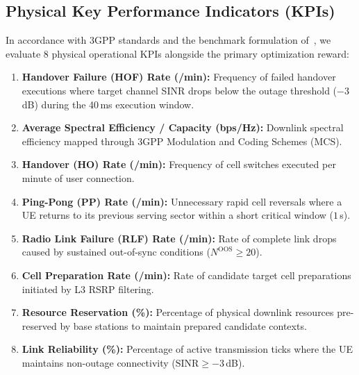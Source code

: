 \documentclass{ieeetmlcn}
\begin{document}
\subsection{Physical Key Performance Indicators (KPIs)}
In accordance with 3GPP standards and the benchmark formulation of~\cite{cmab_ho}, we evaluate 8 physical operational KPIs alongside the primary optimization reward:
\begin{enumerate}\setlength\itemsep{0.5pt}\setlength\parskip{0pt}
    \item \textbf{Handover Failure (HOF) Rate (/min):} Frequency of failed handover executions where target channel SINR drops below the outage threshold ($-3$\,dB) during the 40\,ms execution window.
    \item \textbf{Average Spectral Efficiency / Capacity (bps/Hz):} Downlink spectral efficiency mapped through 3GPP Modulation and Coding Schemes (MCS).
    \item \textbf{Handover (HO) Rate (/min):} Frequency of cell switches executed per minute of user connection.
    \item \textbf{Ping-Pong (PP) Rate (/min):} Unnecessary rapid cell reversals where a UE returns to its previous serving sector within a short critical window ($1$\,s).
    \item \textbf{Radio Link Failure (RLF) Rate (/min):} Rate of complete link drops caused by sustained out-of-sync conditions ($N^{\text{OOS}} \ge 20$).
    \item \textbf{Cell Preparation Rate (/min):} Rate of candidate target cell preparations initiated by L3 RSRP filtering.
    \item \textbf{Resource Reservation (\%):} Percentage of physical downlink resources pre-reserved by base stations to maintain prepared candidate contexts.
    \item \textbf{Link Reliability (\%):} Percentage of active transmission ticks where the UE maintains non-outage connectivity ($\text{SINR} \ge -3$\,dB).
\end{enumerate}
\end{document}
